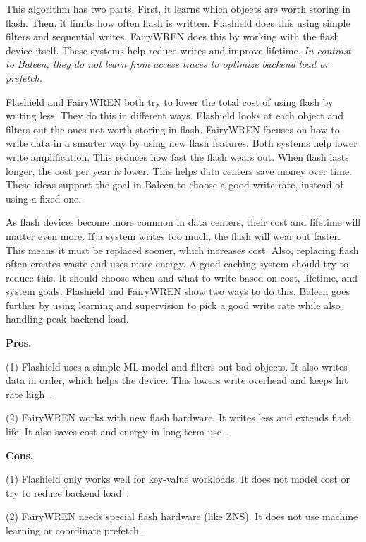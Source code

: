 This algorithm has two parts. First, it learns which objects are worth storing in flash. Then, it limits how often flash is written. Flashield does this using simple filters and sequential writes. FairyWREN does this by working with the flash device itself. These systems help reduce writes and improve lifetime. \textit{In contrast to Baleen, they do not learn from access traces to optimize backend load or prefetch.}

Flashield and FairyWREN both try to lower the total cost of using flash by writing less. They do this in different ways. Flashield looks at each object and filters out the ones not worth storing in flash. FairyWREN focuses on how to write data in a smarter way by using new flash features. Both systems help lower write amplification. This reduces how fast the flash wears out. When flash lasts longer, the cost per year is lower. This helps data centers save money over time. These ideas support the goal in Baleen to choose a good write rate, instead of using a fixed one.

As flash devices become more common in data centers, their cost and lifetime will matter even more. If a system writes too much, the flash will wear out faster. This means it must be replaced sooner, which increases cost. Also, replacing flash often creates waste and uses more energy. A good caching system should try to reduce this. It should choose when and what to write based on cost, lifetime, and system goals. Flashield and FairyWREN show two ways to do this. Baleen goes further by using learning and supervision to pick a good write rate while also handling peak backend load.


\textbf{Pros.}  

(1) Flashield uses a simple ML model and filters out bad objects. It also writes data in order, which helps the device. This lowers write overhead and keeps hit rate high~\cite{nsdi19-flashield}.  

(2) FairyWREN works with new flash hardware. It writes less and extends flash life. It also saves cost and energy in long-term use~\cite{osdi24-fairywren}.

\textbf{Cons.}  

(1) Flashield only works well for key-value workloads. It does not model cost or try to reduce backend load~\cite{nsdi19-flashield}.  

(2) FairyWREN needs special flash hardware (like ZNS). It does not use machine learning or coordinate prefetch~\cite{osdi24-fairywren}.


